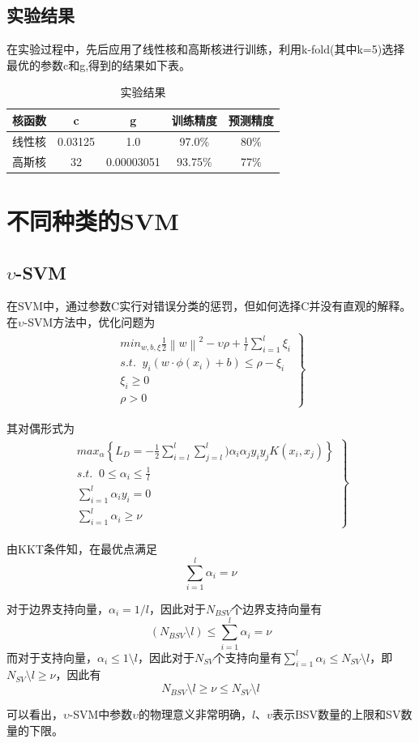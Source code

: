\documentclass[UTF8]{ctexart}
\begin{document}
\subsection*{实验结果}
\par 在实验过程中，先后应用了线性核和高斯核进行训练，利用k-fold(其中k=5)选择最优的参数c和g,得到的结果如下表。
\begin{table}[!hbp]
\centering
\begin{tabular}{|c|c|c|c|c|}
\hline
\hline
 核函数 &  c &  g &  训练精度 &  预测精度 \\
\hline
 线性核 &  0.03125 &  1.0 & 97.0$\%$  &  80$\%$ \\
\hline
 高斯核 &  32 &  0.00003051 &  93.75$\%$ &  77$\%$ \\
\hline
\hline
\end{tabular}
\caption{实验结果}
\end{table}
\newpage
\section*{不同种类的SVM}
\subsection*{$\upsilon$-SVM}
\par 在SVM中，通过参数C实行对错误分类的惩罚，但如何选择C并没有直观的解释。在$\upsilon$-SVM方法中，优化问题为
\begin{eqnarray}     
\left.            
\begin{array}{ccc}     
min_{w,b,\xi }\frac{1}{2}\left \| w \right \|^{2}-\upsilon\rho +\frac{1}{l}\sum_{i=1}^{l}\xi _{i} \\
s.t.\; \; y_{i}(w\cdot \phi (x_{i})+b)\leq \rho -\xi _{i}\\   
\xi _{i}\geq 0\\
\rho > 0
\end{array}          
\right\}         
\end{eqnarray} 
\par 其对偶形式为
\begin{eqnarray}     
\left.            
\begin{array}{ccc}     
max_{\alpha} \left \{ L_{D}=-\frac{1}{2}\sum_{i=l}^{l}\sum_{j=l}^{l})\alpha _{i} \alpha _{j} y_{i} y_{j}K(x_{i},x_{j}) \right \}\\
s.t.\; \; 0\leq \alpha _{i}\leq \frac{1}{l} \\
\sum_{i=1}^{l}\alpha _{i}y_{i}=0\\   
\sum_{i=1}^{l}\alpha _{i}\geq \nu
\end{array}          
\right\}         
\end{eqnarray} 
\par 由KKT条件知，在最优点满足
$$\sum_{i=1}^{l}\alpha _{i}= \nu$$
\par 对于边界支持向量，$\alpha_{i}=1/l$，因此对于$N_{BSV}$个边界支持向量有$$(N_{BSV}\setminus l)\leq \sum_{i=1}^l{}\alpha _{i}=\nu$$ 而对于支持向量，$\alpha_{i} \leq 1 \setminus l$，因此对于$N_{SV}$个支持向量有$\sum_{i=1}^l{}\alpha _{i}\leq N_{SV}\setminus l$，即$N_{SV}\setminus l \geq \nu $，因此有
$$N_{BSV}\setminus l \geq \nu \leq N_{SV}\setminus l$$
\par 可以看出，$\upsilon$-SVM中参数$\upsilon$的物理意义非常明确，$l、v$表示BSV数量的上限和SV数量的下限。
\end{document}
